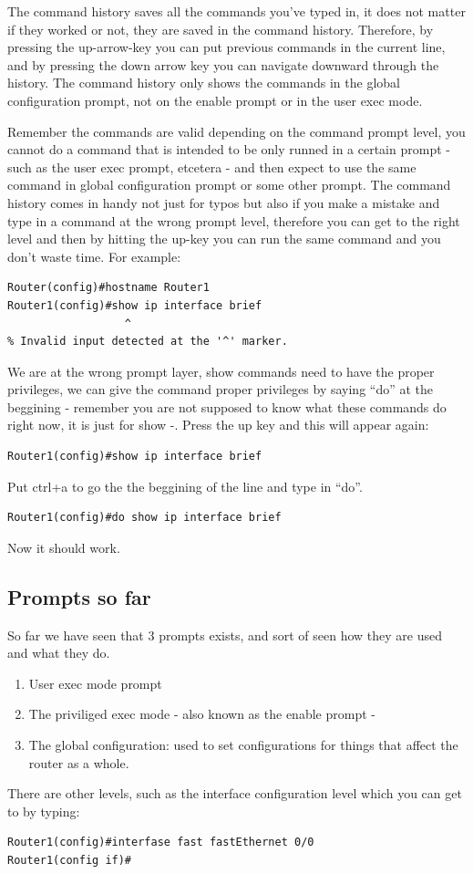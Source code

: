 The command history saves all the commands you've typed in, it does not matter if they worked or not, they are saved in the command history. Therefore, by pressing the up-arrow-key you can put previous commands in the current line, and by pressing the down arrow key you can navigate downward through the history. The command history only shows the commands in the global configuration prompt, not on the enable prompt or in the user exec mode.

Remember the commands are valid depending on the command prompt level, you cannot do a command that is intended to be only runned in a certain prompt - such as the user exec prompt, etcetera - and then expect to use the same command in global configuration prompt or some other prompt. The command history comes in handy not just for typos but also if you make a mistake and type in a command at the wrong prompt level, therefore you can get to the right level and then by hitting the up-key you can run the same command and you don't waste time. For example:
\begin{verbatim}
Router(config)#hostname Router1
Router1(config)#show ip interface brief 
                  ^
% Invalid input detected at the '^' marker.
\end{verbatim}
We are at the wrong prompt layer, show commands need to have the proper privileges, we can give the command proper privileges by saying ``do'' at the beggining - remember you are not supposed to know what these commands do right now, it is just for show -.
Press the up key and this will appear again:
\begin{verbatim}
Router1(config)#show ip interface brief
\end{verbatim}
Put ctrl+a to go the the beggining of the line and type in ``do''.
\begin{verbatim}
Router1(config)#do show ip interface brief
\end{verbatim}
Now it should work.

\subsection{Prompts so far}
So far we have seen that 3 prompts exists, and sort of seen how they are used and what they do. 
\begin{enumerate}
    \item User exec mode prompt 
    \item The priviliged exec mode - also known as the enable prompt -
    \item The global configuration: used to set configurations for things that affect the router as a whole.
\end{enumerate}
There are other levels, such as the interface configuration level which you can get to by typing:
\begin{verbatim}
Router1(config)#interfase fast fastEthernet 0/0
Router1(config if)#
\end{verbatim}

